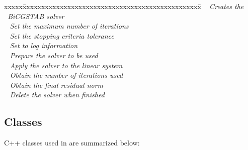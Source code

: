 \documentclass[10pt]{article}
\begin{document}
 \begin{tabbing}
xxxxx\=xxxxxxxxxxxxxxxxxxxxxxxxxxxxxxxxxxxxxxxxxxxxxxxx\=\kill
\> \done\ 
   \> \textit{Creates the \hypre\ BiCGSTAB solver} \\
\> \done\ 
   \> \textit{Set the maximum number of iterations} \\
\> \done\ 
   \> \textit{Set the stopping criteria tolerance} \\
\> \done\ 
   \> \textit{Set to log information} \\
\> \done\ 
   \> \textit{Prepare the solver to be used} \\
\> \done\ 
   \> \textit{Apply the solver to the linear system} \\
\> \done\ 
   \> \textit{Obtain the number of iterations used} \\
\> \done\ 
   \> \textit{Obtain the final residual norm} \\
\> \done\ 
   \> \textit{Delete the solver when finished}
\end{tabbing}


\subsection{Classes} \label{ss:classes}

C++ classes used in  are summarized below:
\end{document}
